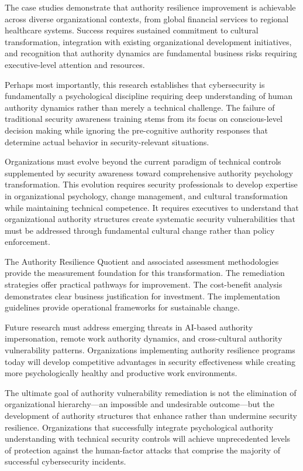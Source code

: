 \documentclass[11pt,a4paper]{article}
\begin{document}
The case studies demonstrate that authority resilience improvement is achievable across diverse organizational contexts, from global financial services to regional healthcare systems. Success requires sustained commitment to cultural transformation, integration with existing organizational development initiatives, and recognition that authority dynamics are fundamental business risks requiring executive-level attention and resources.

Perhaps most importantly, this research establishes that cybersecurity is fundamentally a psychological discipline requiring deep understanding of human authority dynamics rather than merely a technical challenge. The failure of traditional security awareness training stems from its focus on conscious-level decision making while ignoring the pre-cognitive authority responses that determine actual behavior in security-relevant situations.

Organizations must evolve beyond the current paradigm of technical controls supplemented by security awareness toward comprehensive authority psychology transformation. This evolution requires security professionals to develop expertise in organizational psychology, change management, and cultural transformation while maintaining technical competence. It requires executives to understand that organizational authority structures create systematic security vulnerabilities that must be addressed through fundamental cultural change rather than policy enforcement.

The Authority Resilience Quotient and associated assessment methodologies provide the measurement foundation for this transformation. The remediation strategies offer practical pathways for improvement. The cost-benefit analysis demonstrates clear business justification for investment. The implementation guidelines provide operational frameworks for sustainable change.

Future research must address emerging threats in AI-based authority impersonation, remote work authority dynamics, and cross-cultural authority vulnerability patterns. Organizations implementing authority resilience programs today will develop competitive advantages in security effectiveness while creating more psychologically healthy and productive work environments.

The ultimate goal of authority vulnerability remediation is not the elimination of organizational hierarchy—an impossible and undesirable outcome—but the development of authority structures that enhance rather than undermine security resilience. Organizations that successfully integrate psychological authority understanding with technical security controls will achieve unprecedented levels of protection against the human-factor attacks that comprise the majority of successful cybersecurity incidents.
\end{document}
